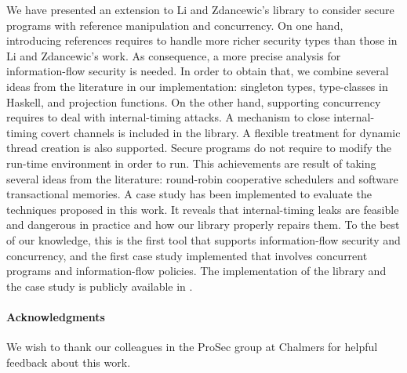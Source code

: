 \documentclass[times, 10pt,twocolumn]{article}
\begin{document}
We have presented an extension to Li and Zdancewic's library to 
consider secure programs with reference manipulation and concurrency. 
On one hand, introducing references requires to handle more richer security 
types than those in Li and Zdancewic's work. As consequence, a more precise
analysis for information-flow security is needed.
In order to obtain that, we combine several ideas from the literature 
in our implementation: singleton types, type-classes in Haskell, 
and projection functions. 
On the other hand, supporting concurrency requires to deal  
with internal-timing attacks. A mechanism to close internal-timing
covert channels 
is included in the 
library. 
A flexible treatment for dynamic thread creation is also 
supported. Secure programs 
do not require to modify the run-time environment in order to 
run. This achievements are result of taking several
ideas from the literature: round-robin cooperative schedulers and 
software transactional memories. 
A case study  has been implemented to evaluate the techniques 
proposed in this work. It reveals that internal-timing
leaks are feasible and dangerous in practice and how  
our library properly repairs them. 
To the best of our knowledge, this is the first tool that supports
information-flow security and concurrency, and the first case study implemented
that involves concurrent programs and information-flow policies. The
implementation of the library and the case study is publicly available in 
\cite{flowarrowref}.


\paragraph*{Acknowledgments}
We wish to thank our colleagues in the ProSec group at Chalmers 
for helpful feedback about this work.  


\end{document}

